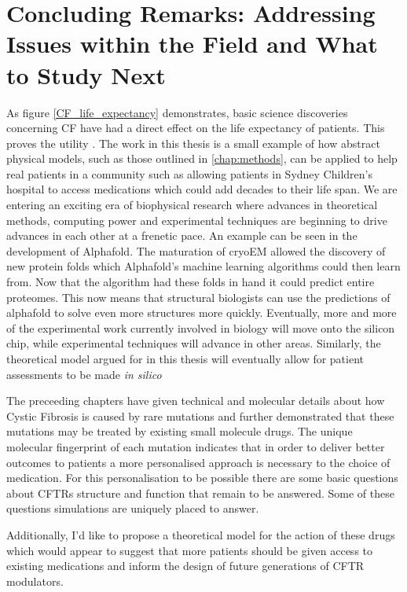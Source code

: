 \chapter{Concluding Remarks: Addressing Issues within the Field and What to Study Next }
\label{chap:conc}

As figure \ref{CF_life_expectancy} demonstrates, basic science discoveries concerning CF have had a direct effect on the life expectancy of patients. This proves the utility . The work in this thesis is a small example of how abstract physical models, such as those outlined in \ref{chap:methods}, can be applied to help real patients in a community such as allowing patients in Sydney Children's hospital to access medications which could add decades to their life span. We are entering an exciting era of biophysical research where advances in theoretical methods, computing power and experimental techniques are beginning to drive advances in each other at a frenetic pace. An example can be seen in the development of Alphafold. The maturation of cryoEM allowed the discovery of new protein folds which Alphafold's machine learning algorithms could then learn from. Now that the algorithm had these folds in hand it could predict entire proteomes. This now means that structural biologists can use the predictions of alphafold to solve even more structures more quickly. Eventually, more and more of the experimental work currently involved in biology will move onto the silicon chip, while experimental techniques will advance in other areas. Similarly, the theoretical model argued for in this thesis will eventually allow for patient assessments to be made \textit{in silico}

The preceeding chapters have given technical and molecular details about how Cystic Fibrosis is caused by rare mutations and further demonstrated that these mutations may be treated by existing small molecule drugs. The unique molecular fingerprint of each mutation indicates that in order to deliver better outcomes to patients a more personalised approach is necessary to the choice of medication. For this personalisation to be possible there are some basic questions about CFTRs structure and function that remain to be answered. Some of these questions simulations are uniquely placed to answer. 

Additionally, I'd like to propose a theoretical model for the action of these drugs which would appear to suggest that more patients should be given access to existing medications and inform the design of future generations of CFTR modulators. 

